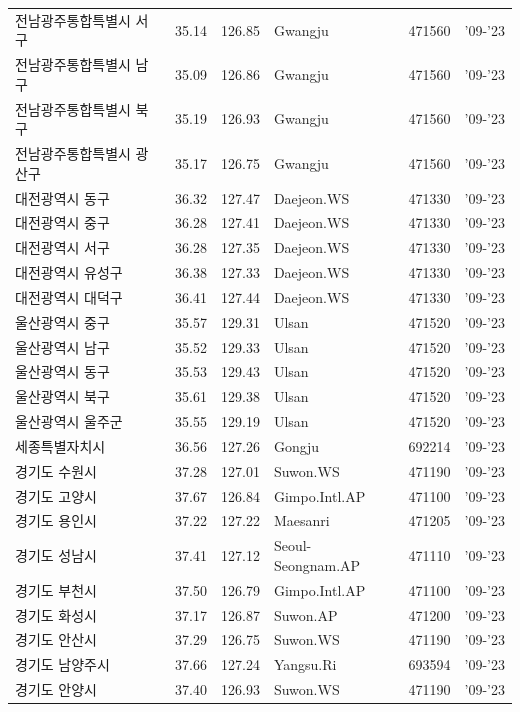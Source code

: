 \begin{longtable}{lcclcc}
  전남광주통합특별시 서구 & 35.14 & 126.85 & Gwangju & 471560 & '09-'23 \\
  전남광주통합특별시 남구 & 35.09 & 126.86 & Gwangju & 471560 & '09-'23 \\
  전남광주통합특별시 북구 & 35.19 & 126.93 & Gwangju & 471560 & '09-'23 \\
  전남광주통합특별시 광산구 & 35.17 & 126.75 & Gwangju & 471560 & '09-'23 \\
  대전광역시 동구 & 36.32 & 127.47 & Daejeon.WS & 471330 & '09-'23 \\
  대전광역시 중구 & 36.28 & 127.41 & Daejeon.WS & 471330 & '09-'23 \\
  대전광역시 서구 & 36.28 & 127.35 & Daejeon.WS & 471330 & '09-'23 \\
  대전광역시 유성구 & 36.38 & 127.33 & Daejeon.WS & 471330 & '09-'23 \\
  대전광역시 대덕구 & 36.41 & 127.44 & Daejeon.WS & 471330 & '09-'23 \\
  울산광역시 중구 & 35.57 & 129.31 & Ulsan & 471520 & '09-'23 \\
  울산광역시 남구 & 35.52 & 129.33 & Ulsan & 471520 & '09-'23 \\
  울산광역시 동구 & 35.53 & 129.43 & Ulsan & 471520 & '09-'23 \\
  울산광역시 북구 & 35.61 & 129.38 & Ulsan & 471520 & '09-'23 \\
  울산광역시 울주군 & 35.55 & 129.19 & Ulsan & 471520 & '09-'23 \\
  세종특별자치시 & 36.56 & 127.26 & Gongju & 692214 & '09-'23 \\
  경기도 수원시 & 37.28 & 127.01 & Suwon.WS & 471190 & '09-'23 \\
  경기도 고양시 & 37.67 & 126.84 & Gimpo.Intl.AP & 471100 & '09-'23 \\
  경기도 용인시 & 37.22 & 127.22 & Maesanri & 471205 & '09-'23 \\
  경기도 성남시 & 37.41 & 127.12 & Seoul-Seongnam.AP & 471110 & '09-'23 \\
  경기도 부천시 & 37.50 & 126.79 & Gimpo.Intl.AP & 471100 & '09-'23 \\
  경기도 화성시 & 37.17 & 126.87 & Suwon.AP & 471200 & '09-'23 \\
  경기도 안산시 & 37.29 & 126.75 & Suwon.WS & 471190 & '09-'23 \\
  경기도 남양주시 & 37.66 & 127.24 & Yangsu.Ri & 693594 & '09-'23 \\
  경기도 안양시 & 37.40 & 126.93 & Suwon.WS & 471190 & '09-'23 \\

\end{longtable}
